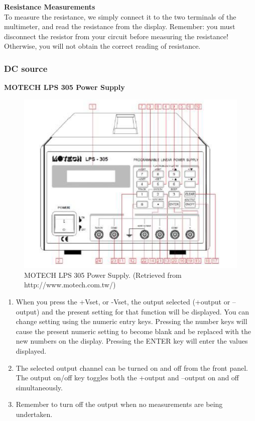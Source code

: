 \documentclass{article}
\begin{document}
\vspace{10pt}
\indent \textbf{Resistance Measurements} \\
\indent To measure the resistance, we simply connect it to the two terminals of the multimeter, and read the resistance from the display. Remember: you must disconnect the resistor from your circuit before measuring the resistance! Otherwise, you will not obtain the correct reading of resistance. 

\subsubsection{DC source}

\vspace{10pt}
\indent \textbf{MOTECH LPS 305 Power Supply} \\
\begin{figure}[H]\centering
\includegraphics[scale=0.4]{supply1.png}
\caption{MOTECH LPS 305 Power Supply. (Retrieved from http://www.motech.com.tw/)}
\end{figure}
\begin{enumerate}
\item When you press the +Vset, or -Vset, the output selected (+output or –output) and the present setting for that function will be displayed. You can change setting using the numeric entry keys. Pressing the number keys will cause the present numeric setting to become blank and be replaced with the new numbers on the display. Pressing the ENTER key will enter the values displayed.
\item The selected output channel can be turned on and off from the front panel. The output on/off key toggles both the +output and –output on and off simultaneously.
\item Remember to turn off the output when no measurements are being undertaken.
\end{enumerate}
\end{document}
